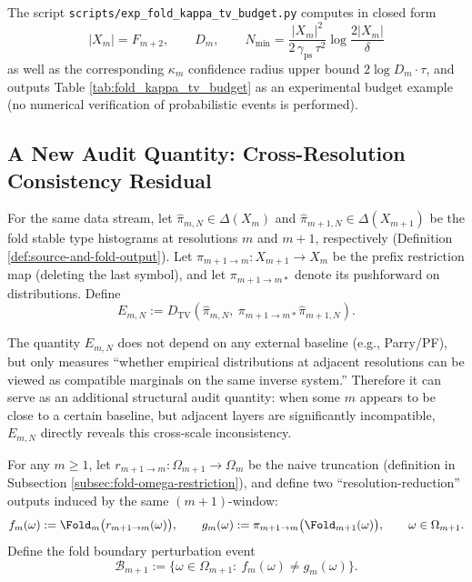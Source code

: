 \begin{remark}\label{rem:fold-kappa-tv-budget-repro}
The script \texttt{scripts/exp\_fold\_kappa\_tv\_budget.py} computes in closed form
\[
|X_m|=F_{m+2},\qquad D_m,\qquad
N_{\min}=\frac{|X_m|^{2}}{2\,\gamma_{\mathrm{ps}}\,\tau^{2}}\log\frac{2|X_m|}{\delta}
\]
as well as the corresponding \(\kappa_m\) confidence radius upper bound \(2\log D_m\cdot\tau\), and outputs Table \ref{tab:fold_kappa_tv_budget} as an experimental budget example (no numerical verification of probabilistic events is performed).

\end{remark}

\subsection{A New Audit Quantity: Cross-Resolution Consistency Residual}\label{subsec:multiscale-residual}

\begin{definition}\label{def:multiscale-residual}
For the same data stream, let \(\hat{\pi}_{m,N}\in\Delta(X_m)\) and \(\hat{\pi}_{m+1,N}\in\Delta(X_{m+1})\) be the fold stable type histograms at resolutions \(m\) and \(m+1\), respectively (Definition \ref{def:source-and-fold-output}). Let \(\pi_{m+1\to m}:X_{m+1}\to X_m\) be the prefix restriction map (deleting the last symbol), and let \(\pi_{m+1\to m*}\) denote its pushforward on distributions. Define
\[
E_{m,N}
:=
D_{\mathrm{TV}}\!\left(\hat{\pi}_{m,N},\ \pi_{m+1\to m*}\hat{\pi}_{m+1,N}\right).
\]
\end{definition}

\begin{remark}
The quantity \(E_{m,N}\) does not depend on any external baseline (e.g., Parry/PF), but only measures ``whether empirical distributions at adjacent resolutions can be viewed as compatible marginals on the same inverse system.'' Therefore it can serve as an additional structural audit quantity: when some \(m\) appears to be close to a certain baseline, but adjacent layers are significantly incompatible, \(E_{m,N}\) directly reveals this cross-scale inconsistency.
\end{remark}

\begin{definition}\label{def:fold-boundary-event}
For any $m\ge 1$, let $r_{m+1\to m}:\Omega_{m+1}\to\Omega_m$ be the naive truncation (definition in Subsection \ref{subsec:fold-omega-restriction}), and define two ``resolution-reduction'' outputs induced by the same $(m{+}1)$-window:
\[
f_m(\omega):=\Fold_m\bigl(r_{m+1\to m}(\omega)\bigr),\qquad
g_m(\omega):=\pi_{m+1\to m}\bigl(\Fold_{m+1}(\omega)\bigr),\qquad \omega\in\Omega_{m+1}.
\]
Define the fold boundary perturbation event
\[
\mathcal{B}_{m+1}:=\{\omega\in\Omega_{m+1}:\ f_m(\omega)\ne g_m(\omega)\}.
\]
\end{definition}

